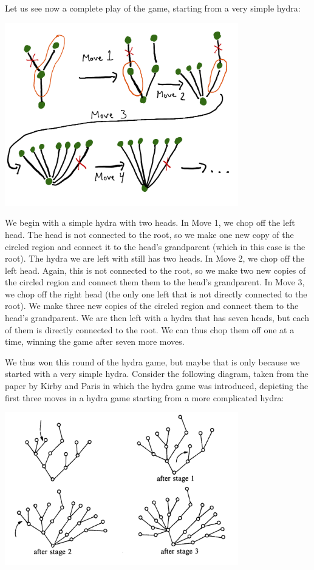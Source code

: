 \documentclass[a4paper]{memoir}
\theoremstyle{definition}
\begin{document}
Let us see now a complete play of the game, starting from a very simple hydra:
\begin{center}
  \includegraphics[width=4in]{Hydra11}
\end{center}

We begin with a simple hydra with two heads. In Move 1, we chop off the left head. 
The head is not connected to the root, so we make one new copy of the circled region 
and connect it to the head's grandparent (which in this case is the root). The hydra 
we are left with still has two heads. In Move 2, we chop off the left head. Again, this 
is not connected to the root, so we make two new copies of the circled region and connect 
them them to the head's grandparent. In Move 3, we chop off the right head (the only one 
left that is not directly connected to the root). We make three new copies of the circled 
region and connect them to the head's grandparent. We are then left with a hydra that has 
seven heads, but each of them is directly connected to the root. We can thus chop them off 
one at a time, winning the game after seven more moves.

We thus won this round of the hydra game, but maybe that is only because we started with a 
very simple hydra. Consider the following diagram, taken from the paper by Kirby and 
Paris in which the hydra game was introduced, depicting the first three moves in a hydra 
game starting from a more complicated hydra:

\begin{center}
  \includegraphics[width=4in]{HydraKP}
\end{center}
\end{document}
